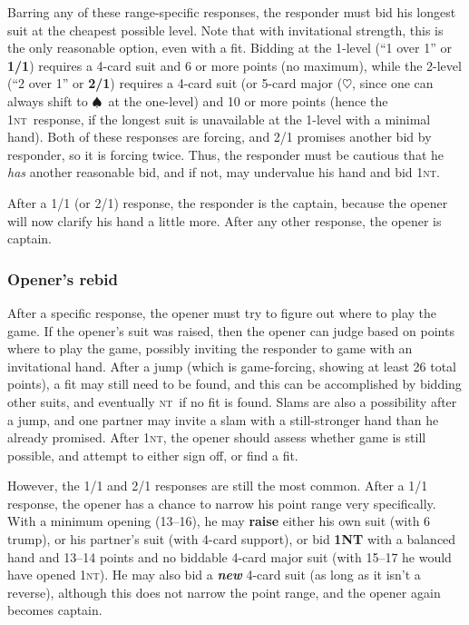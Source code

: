 \documentclass[11pt]{article}
\def\H{$\heartsuit$}
\def\S{$\spadesuit$}
\def\NT{\textsc{nt}}
\begin{document}
Barring any of these range-specific responses, the responder must bid
his longest suit at the cheapest possible level.  Note that with
invitational strength, this is the only reasonable option, even with a
fit.  Bidding at the 1-level (``1 over 1'' or \textbf{1/1}) requires a
4-card suit and 6 or more points (no maximum), while the 2-level (``2
over 1'' or \textbf{2/1}) requires a 4-card suit (or 5-card major (\H,
since one can always shift to \S\ at the one-level) and 10 or more
points (hence the 1\NT\ response, if the longest suit is unavailable
at the 1-level with a minimal hand).  Both of these responses are
forcing, and 2/1 promises another bid by responder, so it is forcing
twice.  Thus, the responder must be cautious that he \emph{has}
another reasonable bid, and if not, may undervalue his hand and bid
1\NT.

After a 1/1 (or 2/1) response, the responder is the captain, because the
opener will now clarify his hand a little more.  After any other
response, the opener is captain.

\subsubsection{Opener's rebid}

After a specific response, the opener must try to figure out where
to play the game.  If the opener's suit was raised, then the opener
can judge based on points where to play the game, possibly inviting
the responder to game with an invitational hand.  After a jump (which
is game-forcing, showing at least 26 total points), a fit may still
need to be found, and this can be accomplished by bidding other
suits, and eventually \NT\ if no fit is found.  Slams are also
a possibility after a jump, and one partner may invite a slam
with a still-stronger hand than he already promised.  After 1\NT,
the opener should assess whether game is still possible, and attempt
to either sign off, or find a fit.

However, the 1/1 and 2/1 responses are still the most common.  After a
1/1 response, the opener has a chance to narrow his point range very
specifically.  With a minimum opening (13--16), he may \textbf{raise}
either his own suit (with 6 trump), or his partner's suit (with 4-card
support), or bid \textbf{1NT} with a balanced hand and 13--14 points
and no biddable 4-card major suit (with 15--17 he would have opened
1\NT).  He may also bid a \textbf{\emph{new}} 4-card suit (as long as
it isn't a reverse), although this does not narrow the point range,
and the opener again becomes captain.
\end{document}
